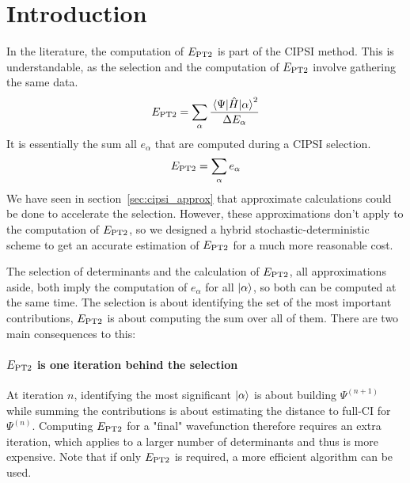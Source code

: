\documentclass[./thesis.tex]{subfiles}
\begin{document}
\label{chap:PT2}

\section{Introduction}


In the literature, the computation of $E_\text{PT2}$ is part of the CIPSI method. This is understandable, as the selection and the computation of $E_\text{PT2}$ involve gathering the same data.
\begin{equation}
E_\text{PT2} = \sum_\alpha \frac{\mel{\Psi}{\hat{H}}{\alpha}^2}{\Delta E_\alpha}
\end{equation}
It is essentially the sum all $e_\alpha$ that are computed during a CIPSI selection.
\begin{equation}
E_\text{PT2} = \sum_\alpha e_\alpha
\end{equation}
We have seen in section~\ref{sec:cipsi_approx} that approximate calculations could be done to accelerate the selection. However, these approximations don't apply to the computation of $E_\text{PT2}$, so we designed a hybrid stochastic-deterministic scheme to get an accurate estimation of $E_\text{PT2}$ for a much more reasonable cost. 


The selection of determinants and the calculation of $E_\text{PT2}$, all approximations aside, both imply the computation of $e_\alpha$ for all $\ket \alpha$, so both can be computed at the same time. The selection is about identifying the set of the most important contributions, $E_\text{PT2}$ is about computing the sum over all of them. There are two main consequences to this:
\paragraph{$E_\text{PT2}$ is one iteration behind the selection}
At iteration $n$, identifying the most significant $\ket \alpha$ is about building $\Psi^{(n+1)}$ while summing the contributions is about estimating the distance to full-CI for $\Psi^{(n)}$. Computing $E_\text{PT2}$ for a "final" wavefunction therefore requires an extra iteration, which applies to a larger number of determinants and thus is more expensive. Note that if only $E_\text{PT2}$ is required, a more efficient algorithm can be used.\cite{Cimiraglia_1996}
\end{document}
